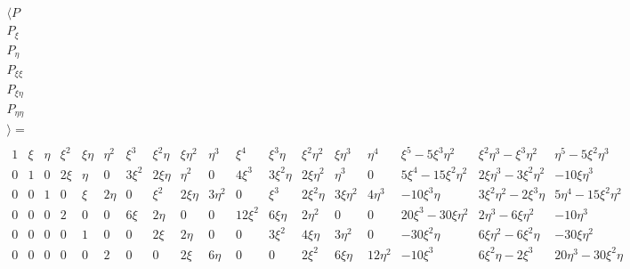 \documentclass{report}
\begin{document}
\begin{equation}
\begin{array}{l}
\bigl \langle
P\\
P_\xi\\
P_\eta\\
P_{\xi\xi}\\
P_{\xi\eta}\\
P_{\eta\eta}\\
\bigr \rangle
= \\
\begin{array}{lllllllllllllllllll}
1 
&\xi   &\eta 
&\xi^2 &\xi\eta     &\eta^2 
&\xi^3 &\xi^2\eta   &\xi\eta^2               &\eta^3 
&\xi^4 &\xi^3\eta   &\xi^2\eta^2             &\xi\eta^3              &\eta^4 
&\xi^5-5\xi^3\eta^2 &\xi^2\eta^3-\xi^3\eta^2 &\eta^5-5\xi^2\eta^3
\\
0 
&1      &0
&2\xi   &\eta         &0
&3\xi^2 &2\xi\eta     &\eta^2                  &0
&4\xi^3 &3\xi^2\eta   &2\xi\eta^2              &\eta^3         &0
&5\xi^4-15\xi^2\eta^2 &2\xi\eta^3-3\xi^2\eta^2 &-10\xi\eta^3
\\
0 
&0            &1
&0            &\xi                     &2\eta
&0            &\xi^2                   &2\xi\eta               &3\eta^2 
&0            &\xi^3                   &2\xi^2\eta             &3\xi\eta^2  &4\eta^3 
&-10\xi^3\eta &3\xi^2\eta^2-2\xi^3\eta &5\eta^4-15\xi^2\eta^2
\\
0 
&0                   &0
&2                   &0                  &0
&6\xi                &2\eta              &0                  &0
&12\xi^2             &6\xi\eta           &2\eta^2            &0              &0
&20\xi^3-30\xi\eta^2 &2\eta^3-6\xi\eta^2 &-10\eta^3
\\
0 
&0      &0
&0      &1            &0
&0      &2\xi         &2\eta                   &0
&0      &3\xi^2       &4\xi\eta                &3\eta^2         &0
&-30\xi^2\eta   &6\xi\eta^2-6\xi^2\eta &-30\xi\eta^2
\\
0 
&0            &0
&0            &0                       &2
&0            &0                       &2\xi                   &6\eta
&0            &0                       &2\xi^2                 &6\xi\eta    &12\eta^2 
&-10\xi^3     &6\xi^2\eta  -2\xi^3     &20\eta^3-30\xi^2\eta
\\
\end{array}
\end{array}
\end{equation}
\end{document}
